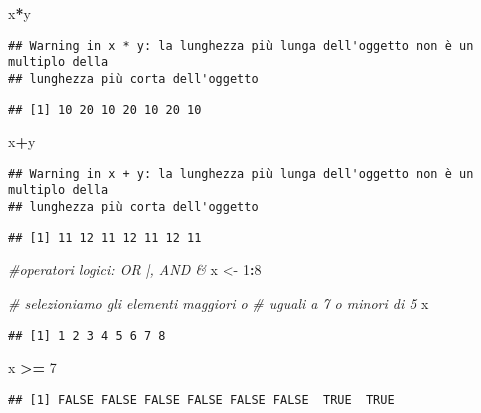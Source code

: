 \documentclass[
]{article}
\newenvironment{Shaded}{\begin{snugshade}}{\end{snugshade}}
\newcommand{\CommentTok}[1]{\textcolor[rgb]{0.56,0.35,0.01}{\textit{#1}}}
\newcommand{\DecValTok}[1]{\textcolor[rgb]{0.00,0.00,0.81}{#1}}
\newcommand{\NormalTok}[1]{#1}
\newcommand{\OtherTok}[1]{\textcolor[rgb]{0.56,0.35,0.01}{#1}}
\newcommand{\SpecialCharTok}[1]{\textcolor[rgb]{0.81,0.36,0.00}{\textbf{#1}}}
\begin{document}
\begin{Shaded}
\begin{Highlighting}[]
\NormalTok{x}\SpecialCharTok{*}\NormalTok{y   }
\end{Highlighting}
\end{Shaded}

\begin{verbatim}
## Warning in x * y: la lunghezza più lunga dell'oggetto non è un multiplo della
## lunghezza più corta dell'oggetto
\end{verbatim}

\begin{verbatim}
## [1] 10 20 10 20 10 20 10
\end{verbatim}

\begin{Shaded}
\begin{Highlighting}[]
\NormalTok{x}\SpecialCharTok{+}\NormalTok{y}
\end{Highlighting}
\end{Shaded}

\begin{verbatim}
## Warning in x + y: la lunghezza più lunga dell'oggetto non è un multiplo della
## lunghezza più corta dell'oggetto
\end{verbatim}

\begin{verbatim}
## [1] 11 12 11 12 11 12 11
\end{verbatim}

\begin{Shaded}
\begin{Highlighting}[]
\CommentTok{\#operatori logici: OR |, AND \&}
\NormalTok{x }\OtherTok{\textless{}{-}} \DecValTok{1}\SpecialCharTok{:}\DecValTok{8}

\CommentTok{\# selezioniamo gli elementi maggiori o }
\CommentTok{\# uguali a 7 o minori di 5}
\NormalTok{x}
\end{Highlighting}
\end{Shaded}

\begin{verbatim}
## [1] 1 2 3 4 5 6 7 8
\end{verbatim}

\begin{Shaded}
\begin{Highlighting}[]
\NormalTok{x }\SpecialCharTok{\textgreater{}=} \DecValTok{7}
\end{Highlighting}
\end{Shaded}

\begin{verbatim}
## [1] FALSE FALSE FALSE FALSE FALSE FALSE  TRUE  TRUE
\end{verbatim}
\end{document}
